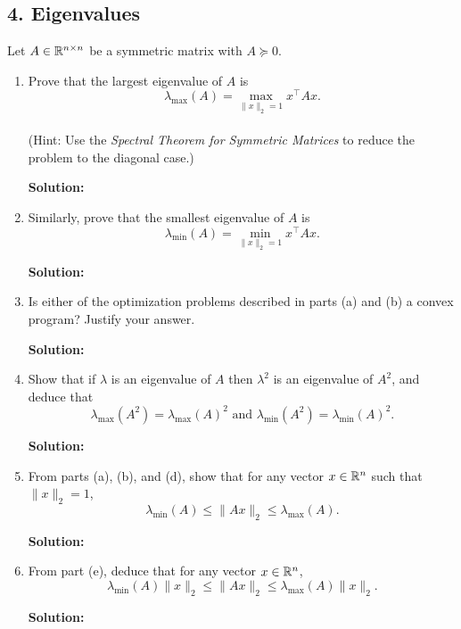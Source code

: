 \documentclass{article}
\newcommand{\solution}{\textbf{Solution: }}
\begin{document}
\newpage
\subsection*{4. Eigenvalues}
Let $A \in \mathbb{R}^{n\times n}$ be a symmetric matrix with $A \succeq 0$.
\begin{enumerate}[label=(\alph*)]
    \item Prove that the largest eigenvalue of $A$ is $$\lambda_{\max}(A) = \max_{\lVert x \rVert_2 = 1} x^{\top} Ax.$$ \\
    (Hint: Use the \emph{Spectral Theorem for Symmetric Matrices} to reduce the problem to the diagonal case.)
    \begin{mdframed} \solution
    \end{mdframed}

    \item Similarly, prove that the smallest eigenvalue of $A$ is $$\lambda_{\min}(A) = \min_{\lVert x\rVert_2 = 1} x^{\top} Ax.$$
    \begin{mdframed}
    \solution %
    \end{mdframed}

    \item Is either of the optimization problems described in parts (a) and (b) a convex program? Justify your answer.
    \begin{mdframed}
    \solution %
    \end{mdframed}

    \item Show that if $\lambda$ is an eigenvalue of $A$ then $\lambda^2$ is an eigenvalue of $A^2$, and deduce that $$\lambda_{\max}(A^2) = \lambda_{\max}(A)^2 \text{ and } \lambda_{\min}(A^2) = \lambda_{\min}(A)^2.$$
    \begin{mdframed}
    \solution %
    \end{mdframed}

    \item From parts (a), (b), and (d), show that for any vector $x \in \mathbb{R}^n$ such that $\lVert x \rVert_2 = 1$, $$\lambda_{\min}(A) \leq \lVert Ax \rVert_2 \leq \lambda_{\max}(A).$$
    \begin{mdframed}
    \solution %
    \end{mdframed}

    \item From part (e), deduce that for any vector $x \in \mathbb{R}^n$, $$\lambda_{\min}(A) \lVert x \rVert_2 \leq \lVert Ax \rVert_2 \leq \lambda_{\max}(A)\lVert x \rVert_2.$$
    \begin{mdframed}
    \solution %
    \end{mdframed}
\end{enumerate}
\end{document}
